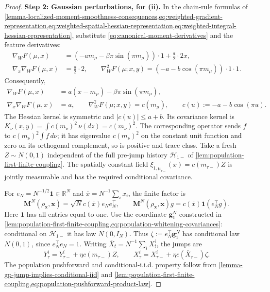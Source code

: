 \begin{proof}
\par\noindent\textbf{Step 2: Gaussian perturbations, for (ii).}
In the chain-rule formulas of
\cref{lemma-localized-moment-smoothness-consequences,eq:weighted-gradient-representation,eq:weighted-spatial-hessian-representation,eq:weighted-integral-hessian-representation},
substitute \eqref{eq:canonical-moment-derivatives} and the feature derivatives:
\[
 \begin{aligned}
 \nabla_WF(\mu,x)&=(-am_\mu-\beta\pi\sin(\pi m_\mu))\cdot1+\tfrac a2\cdot2x,\\
 \nabla_x\nabla_WF(\mu,x)&=\tfrac a2\cdot2,\qquad
 \nabla_W^2F(\mu;x,y)=(-a-b\cos(\pi m_\mu))\cdot1\cdot1.
 \end{aligned}
\]
Consequently,
\begin{equation}
 \begin{split}
 \nabla_WF(\mu,x)&=a(x-m_\mu)-\beta\pi\sin(\pi m_\mu),\\
 \nabla_x\nabla_WF(\mu,x)&=a,\qquad
 \nabla_W^2F(\mu;x,y)=c(m_\mu),\qquad c(u):=-a-b\cos(\pi u).
 \end{split}
 \label{eq:canonical-wasserstein-derivatives}
\end{equation}
The Hessian kernel is symmetric and $|c(u)|\le a+b$.
Its covariance kernel is $K_\nu(x,y)=\int c(m_\nu)^2\,\nu(dz)=c(m_\nu)^2$.
The corresponding operator sends $f$ to $c(m_\nu)^2\int f\,d\nu$;
it has eigenvalue $c(m_\nu)^2$ on the constant unit function and zero
on its orthogonal complement, so is positive and trace class.
Take a fresh $Z\sim N(0,1)$ independent of the full pre-jump history
$\mathcal H_{1-}$ of \cref{lem:population-first-finite-coupling}.
The spatially constant field $\xi_{1,\mu_{\tau-}}(x)=c(m_{\tau-})Z$
is jointly measurable and has the required conditional covariance.

For $e_N=N^{-1/2}\mathbf1\in\mathbb R^N$ and
$\overline x=N^{-1}\sum_i x_i$, the finite factor is
\begin{equation}
 \mathbf M^N(\rho_{\mathbf x},\mathbf x)=\sqrt N c(\overline x)e_Ne_N^\top,
 \qquad \mathbf M^N(\rho_{\mathbf x},\mathbf x)g
             =c(\overline x)\mathbf1(e_N^\top g).
 \label{eq:canonical-finite-factor}
\end{equation}
Here $\mathbf1$ has all entries equal to one.
Use the coordinate $\mathbf g_1^N$ constructed in
\cref{lem:population-first-finite-coupling,eq:population-whitening-covariances}:
conditional on $\mathcal H_{1-}$ it has law $N(0,I_N)$.
Thus $\zeta:=e_N^\top\mathbf g_1^N$ has conditional law $N(0,1)$,
since $e_N^\top e_N=1$.
Writing $\overline X_t=N^{-1}\sum_iX_t^i$, the jumps are
\begin{equation}
 Y_\tau^i=Y_{\tau-}^i+\eta c(m_{\tau-})Z,\qquad
 X_\tau^i=X_{\tau-}^i+\eta c(\overline X_{\tau-})\zeta.
 \label{eq:canonical-jumps}
\end{equation}
The population pushforward and conditional-i.i.d. property follow from
\cref{lemma-gp-jump-implies-conditional-iid} and
\cref{lem:population-first-finite-coupling,eq:population-pushforward-product-law}.


\end{proof}
